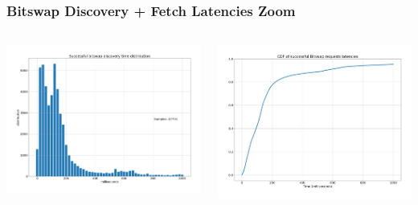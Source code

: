 \documentclass{pl-slide}
\begin{document}
\begin{frame}
\frametitle{Bitswap Discovery + Fetch Latencies Zoom}
\begin{columns}[onlytextwidth]
\begin{column}{0.49\textwidth}
    \begin{center}
		\includegraphics[width=\textwidth]{plots/pdf1.png}
    \end{center}
\end{column}
\begin{column}{0.49\textwidth}
    \begin{center}
		\includegraphics[width=\textwidth]{plots/cdf1.png}
    \end{center}
\end{column}
\end{columns}
\end{frame}
\end{document}
